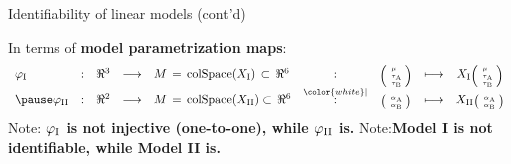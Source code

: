 \begin{frame}{\LARGE Identifiability of linear models (cont'd)}

\vskip -0.35cm



\vskip -0.3cm

\newcommand{\colSpace}{\textnormal{colSpace}}

In terms of \textbf{model parametrization maps}:\pause
{\scriptsize
\vskip -0.6cm
\begin{equation*}
\begin{array}{lclclcccc}
\varphi_{\textnormal{I}} &: &\Re^{3} &\longrightarrow& M \,=\, \colSpace\!\left(X_{\textnormal{I}}\right) \,\subset\, \Re^{6}
&:&
\textnormal{\tiny$\left(\!\begin{array}{l} \mu \\ \tau_{\textnormal{A}} \\ \tau_{\textnormal{B}} \end{array}\!\!\right)$}
&\longmapsto&
X_{\textnormal{I}}
\textnormal{\tiny$\left(\!\begin{array}{l} \mu \\ \tau_{\textnormal{A}} \\ \tau_{\textnormal{B}} \end{array}\!\!\right)$}
\\
\pause
\varphi_{\textnormal{II}} &: & \Re^{2} &\longrightarrow& M \,=\, \colSpace\!\left(X_{\textnormal{II}}\right) \subset\, \Re^{6}
&\overset{{\color{white}\vert}}{:}&
\textnormal{\tiny$\left(\!\begin{array}{l} \alpha_{\textnormal{A}} \\ \alpha_{\textnormal{B}} \end{array}\!\!\right)$}
&\longmapsto&
X_{\textnormal{II}}
\textnormal{\tiny$\left(\!\begin{array}{l} \alpha_{\textnormal{A}} \\ \alpha_{\textnormal{B}} \end{array}\!\!\right)$}
\end{array}
\end{equation*}
}\pause
Note:\quad
\textbf{$\varphi_{\textnormal{I}}$\; is not injective (one-to-one), \quad\; \pause while \;$\varphi_{\textnormal{II}}$\; is.}
\vskip 0.1cm
\pause
{\color{white}Note:}\quad\quad\textbf{Model I\; is not identifiable, \;\; while \;Model II\; is.}

\end{frame}
\normalsize


